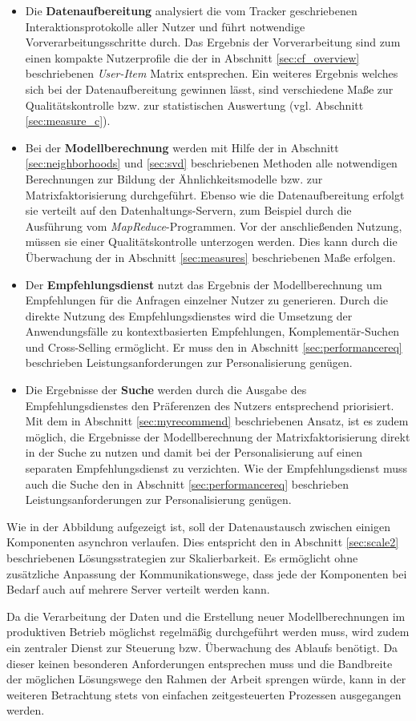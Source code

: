 \begin{itemize}
\item Die \textbf{Datenaufbereitung} analysiert die vom Tracker geschriebenen Interaktionsprotokolle aller Nutzer und führt notwendige Vorverarbeitungsschritte durch. Das Ergebnis der Vorverarbeitung sind zum einen kompakte Nutzerprofile die der in Abschnitt \ref{sec:cf_overview} beschriebenen \textit{User-Item} Matrix entsprechen. Ein weiteres Ergebnis welches sich bei der Datenaufbereitung gewinnen lässt, sind verschiedene Maße zur Qualitätskontrolle bzw. zur statistischen Auswertung (vgl. Abschnitt \ref{sec:measure_c}).
\item Bei der \textbf{Modellberechnung} werden mit Hilfe der in Abschnitt \ref{sec:neighborhoods} und \ref{sec:svd} beschriebenen Methoden alle notwendigen Berechnungen zur Bildung der Ähnlichkeitsmodelle bzw. zur Matrixfaktorisierung durchgeführt. Ebenso wie die Datenaufbereitung erfolgt sie verteilt auf den Datenhaltungs-Servern, zum Beispiel durch die Ausführung vom \textit{MapReduce}-Programmen. Vor der anschließenden Nutzung, müssen sie einer Qualitätskontrolle unterzogen werden. Dies kann durch die Überwachung der in Abschnitt \ref{sec:measures} beschriebenen Maße erfolgen.
\item Der \textbf{Empfehlungsdienst} nutzt das Ergebnis der Modellberechnung um Empfehlungen für die Anfragen einzelner Nutzer zu generieren. Durch die direkte Nutzung des Empfehlungsdienstes wird die Umsetzung der Anwendungsfälle zu kontextbasierten Empfehlungen, Komplementär-Suchen und Cross-Selling ermöglicht.  Er muss den in Abschnitt \ref{sec:performancereq} beschrieben Leistungsanforderungen zur Personalisierung genügen.
\item Die Ergebnisse der \textbf{Suche} werden durch die Ausgabe des Empfehlungsdienstes den Präferenzen des Nutzers entsprechend priorisiert. Mit dem in Abschnitt \ref{sec:myrecommend} beschriebenen Ansatz, ist es zudem möglich, die Ergebnisse der Modellberechnung der Matrixfaktorisierung direkt in der Suche zu nutzen und damit bei der Personalisierung auf einen separaten Empfehlungsdienst zu verzichten. Wie der Empfehlungsdienst muss auch die Suche den in Abschnitt \ref{sec:performancereq} beschrieben Leistungsanforderungen zur Personalisierung genügen.
\end{itemize}

Wie in der Abbildung aufgezeigt ist, soll der Datenaustausch zwischen einigen Komponenten asynchron verlaufen. Dies entspricht den in Abschnitt \ref{sec:scale2} beschriebenen Lösungsstrategien zur Skalierbarkeit. Es ermöglicht ohne zusätzliche Anpassung der Kommunikationswege, dass jede der Komponenten bei Bedarf auch auf mehrere Server verteilt werden kann.

Da die Verarbeitung der Daten und die Erstellung neuer Modellberechnungen im produktiven Betrieb möglichst regelmäßig durchgeführt werden muss, wird zudem ein zentraler Dienst zur Steuerung bzw. Überwachung des Ablaufs benötigt. Da dieser keinen besonderen Anforderungen entsprechen muss und die Bandbreite der möglichen Lösungswege den Rahmen der Arbeit sprengen würde, kann in der weiteren Betrachtung stets von einfachen zeitgesteuerten Prozessen ausgegangen werden. 